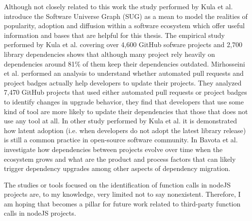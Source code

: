 Although not closely related to this work the study performed by Kula et al. \cite{kula2018generalized} introduce the Software Universe Graph (SUG) as a mean to model the realities of popularity, adoption and diffusion within a software ecosystem which offer useful information and bases that are helpful for this thesis. The empirical study performed by Kula et al. \cite{Kula:2018} covering over 4,600 GitHub sofware projects and 2,700 library dependencies shows that although many project rely heavily on dependencies around 81\% of them keep their dependencies outdated. Mirhosseini et al. \cite{Mirhosseini:2017} performed an analysis to understand whether automated pull requests and project badges actually help developers to update their projects. They analyzed 7,470 GitHub projects that used either automated pull requests or project badges to identify changes in upgrade behavior, they find that developers that use some kind of tool are more likely to update their dependencies that those that does not use any tool at all. In other study performed by Kula et al. \cite{Kula:2015} it is demonstrated how latent adoption (i.e. when developers do not adopt the latest library release) is still a common practice in open-source software community. In \cite{bavota2015apache} Bavota et al. investigate how dependencies between projects evolve over time when the ecosystem grows and what are the product and process factors that can likely trigger dependency upgrades among other aspects of dependency migration.

The studies or tools focused on the identification of function calls in nodeJS projects are, to my knowledge, very limited not to say nonexistent. Therefore, I am hoping that \tool[] becomes a pillar for future work related to third-party function calls in nodeJS projects.
